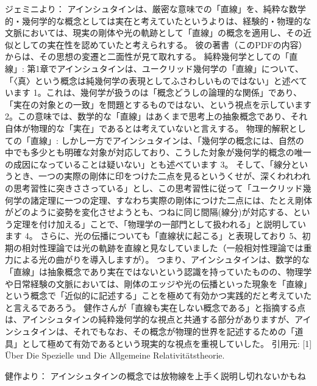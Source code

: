 \documentclass{article}
\begin{document}
ジェミニより：
アインシュタインは、厳密な意味での「直線」を、純粋な数学的・幾何学的な概念としては実在と考えていたというよりは、経験的・物理的な文脈においては、現実の剛体や光の軌跡として「直線」の概念を適用し、その近似としての実在性を認めていたと考えられする。
彼の著書（このPDFの内容）からは、その思想の変遷と二面性が見て取れする。
純粋幾何学としての「直線」:
第1章でアインシュタインは、ユークリッド幾何学の「直線」について、「〈真〉という概念は純幾何学の表現としてふさわしいものではない」と述べています 1。これは、幾何学が扱うのは「概念どうしの論理的な関係」であり、「実在の対象との一致」を問題とするものではない、という視点を示しています 2。この意味では、数学的な「直線」はあくまで思考上の抽象概念であり、それ自体が物理的な「実在」であるとは考えていないと言えする。
物理的解釈としての「直線」:
しかし一方でアインシュタインは、「幾何学の概念には、自然の中でも多少とも明確な対象が対応しており、こうした対象が幾何学的概念の唯一の成因になっていることは疑いない」とも述べています 3。
そして、「線分というとき、一つの実際の剛体に印をつけた二点を見るというくせが、深くわれわれの思考習性に突きささっている」とし、この思考習性に従って「ユークリッド幾何学の諸定理に一つの定理、すなわち実際の剛体につけた二点には、たとえ剛体がどのように姿勢を変化させようとも、つねに同じ間隔(線分)が対応する、という定理を付け加える」ことで、「物理学の一部門として扱われる」と説明しています 4。
さらに、光の伝播についても「直線状に起こる」と表現しており 5、初期の相対性理論では光の軌跡を直線と見なしていました（一般相対性理論では重力による光の曲がりを導入しますが）。
つまり、アインシュタインは、数学的な「直線」は抽象概念であり実在ではないという認識を持っていたものの、物理学や日常経験の文脈においては、剛体のエッジや光の伝播といった現象を「直線」という概念で「近似的に記述する」ことを極めて有効かつ実践的だと考えていたと言えるであろう。
健作さんが「直線も実在しない概念である」と指摘する点は、アインシュタインの純粋幾何学的な視点と共通する部分がありますが、アインシュタインは、それでもなお、その概念が物理的世界を記述するための「道具」として極めて有効であるという現実的な視点を重視していした。
引用元:
[1] Über Die Spezielle und Die Allgemeine Relativitätstheorie.

健作より：
アインシュタインの概念では放物線を上手く説明し切れないかもね
\end{document}
